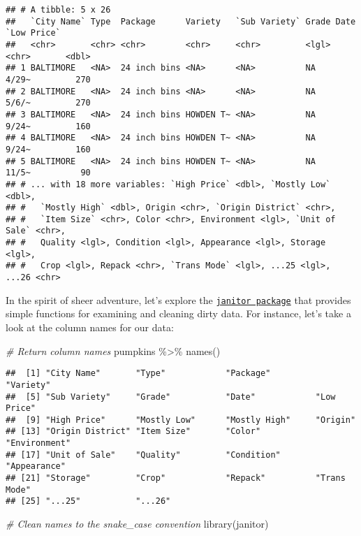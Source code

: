 \documentclass[
]{article}
\newenvironment{Shaded}{\begin{snugshade}}{\end{snugshade}}
\newcommand{\CommentTok}[1]{\textcolor[rgb]{0.56,0.35,0.01}{\textit{#1}}}
\newcommand{\FunctionTok}[1]{\textcolor[rgb]{0.00,0.00,0.00}{#1}}
\newcommand{\NormalTok}[1]{#1}
\newcommand{\SpecialCharTok}[1]{\textcolor[rgb]{0.00,0.00,0.00}{#1}}
\begin{document}
\begin{verbatim}
## # A tibble: 5 x 26
##   `City Name` Type  Package      Variety   `Sub Variety` Grade Date  `Low Price`
##   <chr>       <chr> <chr>        <chr>     <chr>         <lgl> <chr>       <dbl>
## 1 BALTIMORE   <NA>  24 inch bins <NA>      <NA>          NA    4/29~         270
## 2 BALTIMORE   <NA>  24 inch bins <NA>      <NA>          NA    5/6/~         270
## 3 BALTIMORE   <NA>  24 inch bins HOWDEN T~ <NA>          NA    9/24~         160
## 4 BALTIMORE   <NA>  24 inch bins HOWDEN T~ <NA>          NA    9/24~         160
## 5 BALTIMORE   <NA>  24 inch bins HOWDEN T~ <NA>          NA    11/5~          90
## # ... with 18 more variables: `High Price` <dbl>, `Mostly Low` <dbl>,
## #   `Mostly High` <dbl>, Origin <chr>, `Origin District` <chr>,
## #   `Item Size` <chr>, Color <chr>, Environment <lgl>, `Unit of Sale` <chr>,
## #   Quality <lgl>, Condition <lgl>, Appearance <lgl>, Storage <lgl>,
## #   Crop <lgl>, Repack <chr>, `Trans Mode` <lgl>, ...25 <lgl>, ...26 <chr>
\end{verbatim}

In the spirit of sheer adventure, let's explore the
\href{github.com/sfirke/janitor}{\texttt{janitor\ package}} that
provides simple functions for examining and cleaning dirty data. For
instance, let's take a look at the column names for our data:

\begin{Shaded}
\begin{Highlighting}[]
\CommentTok{\# Return column names}
\NormalTok{pumpkins }\SpecialCharTok{\%\textgreater{}\%} 
  \FunctionTok{names}\NormalTok{()}
\end{Highlighting}
\end{Shaded}

\begin{verbatim}
##  [1] "City Name"       "Type"            "Package"         "Variety"        
##  [5] "Sub Variety"     "Grade"           "Date"            "Low Price"      
##  [9] "High Price"      "Mostly Low"      "Mostly High"     "Origin"         
## [13] "Origin District" "Item Size"       "Color"           "Environment"    
## [17] "Unit of Sale"    "Quality"         "Condition"       "Appearance"     
## [21] "Storage"         "Crop"            "Repack"          "Trans Mode"     
## [25] "...25"           "...26"
\end{verbatim}

\begin{Shaded}
\begin{Highlighting}[]
\CommentTok{\# Clean names to the snake\_case convention}
\FunctionTok{library}\NormalTok{(janitor)}
\end{Highlighting}
\end{Shaded}
\end{document}
